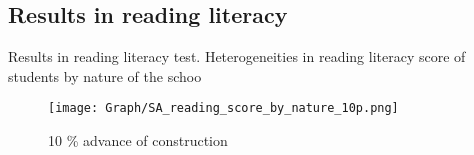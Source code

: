 \documentclass[9pt]{beamer}
\begin{document}
\subsection{Results in reading literacy}
\begin{frame}{ Results in reading literacy test.  \hyperlink{result_read_}{} }\label{10p_read_nat}
\small Heterogeneities in reading literacy score of students by nature of the schoo
\begin{figure}
  \centering
  \texttt{[image: Graph/SA\_reading\_score\_by\_nature\_10p.png]} 
  \caption{\small 10 \% advance of construction}
  \label{fig:6.1sub-first}
\end{figure}

\end{frame}
\end{document}
